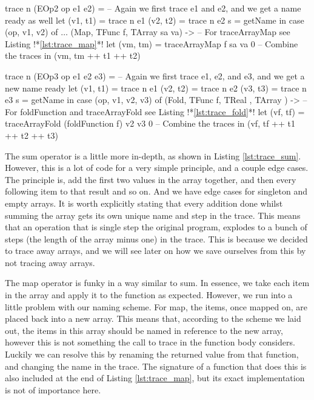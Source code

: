         \begin{haskell}[caption=Tracing away arrays in maps and folds, label=lst:trace_array2, gobble=12]
            trace n (EOp2 op e1 e2) =
                -- Again we first trace e1 and e2, and we get a name ready as well
                let (v1, t1) = trace n e1
                    (v2, t2) = trace n e2
                    s        = getName
                in  case (op, v1, v2) of
                    $\ldots$
                    (Map, TFunc f, TArray sa va) ->
                        -- For traceArrayMap see Listing !*\ref{lst:trace_map}*!
                        let (vm, tm) = traceArrayMap f sa va 0
                        -- Combine the traces
                        in  (vm, tm ++ t1 ++ t2)

            trace n (EOp3 op e1 e2 e3) =
                -- Again we first trace e1, e2, and e3, and we get a new name ready
                let (v1, t1) = trace n e1
                    (v2, t2) = trace n e2
                    (v3, t3) = trace n e3
                    s        = getName
                in  case (op, v1, v2, v3) of
                    (Fold, TFunc f, TReal {}, TArray {}) ->
                        -- For foldFunction and traceArrayFold see Listing !*\ref{lst:trace_fold}*!
                        let (vf, tf) = traceArrayFold (foldFunction f) v2 v3 0
                        -- Combine the traces
                        in  (vf, tf ++ t1 ++ t2 ++ t3)
        \end{haskell}

        The sum operator is a little more in-depth, as shown in Listing \ref{lst:trace_sum}.
        However, this is a lot of code for a very simple principle, and a couple edge cases.
        The principle is, add the first two values in the array together, and then every following item to that result and so on.
        And we have edge cases for singleton and empty arrays.
        It is worth explicitly stating that every addition done whilst summing the array gets its own unique name and step in the trace.
        This means that an operation that is single step the original program, explodes to a bunch of steps (the length of the array minus one) in the trace.
        This is because we decided to trace away arrays, and we will see later on how we save ourselves from this by not tracing away arrays.

        The map operator is funky in a way similar to sum.
        In essence, we take each item in the array and apply it to the function as expected.
        However, we run into a little problem with our naming scheme.
        For map, the items, once mapped on, are placed back into a new array.
        This means that, according to the scheme we laid out, the items in this array should be named in reference to the new array, however this is not something the call to trace in the function body considers.
        Luckily we can resolve this by renaming the returned value from that function, and changing the name in the trace.
        The signature of a function that does this is also included at the end of Listing \ref{lst:trace_map}, but its exact implementation is not of importance here.

